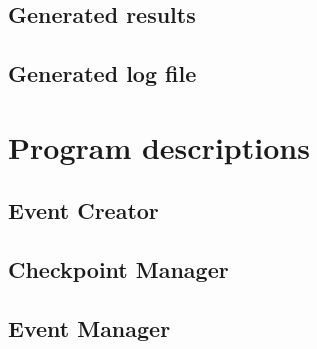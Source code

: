 \documentclass[a4paper, twoside]{article}
\begin{document}
\subsection{Generated results}
\subsection{Generated log file}

\section{Program descriptions}
\subsection{Event Creator}
\subsection{Checkpoint Manager}
\subsection{Event Manager}
\end{document}
